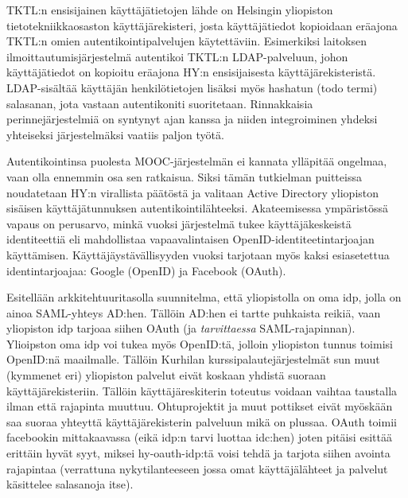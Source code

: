 \documentclass[finnish,gradu]{tktltiki}
\begin{document}
  TKTL:n ensisijainen käyttäjätietojen lähde on Helsingin yliopiston tietotekniikkaosaston käyttäjärekisteri, josta käyttäjätiedot kopioidaan eräajona TKTL:n omien autentikointipalvelujen käytettäviin. Esimerkiksi laitoksen ilmoittautumisjärjestelmä autentikoi TKTL:n LDAP-palveluun, johon käyttäjätiedot on kopioitu eräajona HY:n ensisijaisesta käyttäjärekisteristä. LDAP-sisältää käyttäjän henkilötietojen lisäksi myös hashatun (todo termi) salasanan, jota vastaan autentikoniti suoritetaan. Rinnakkaisia perinnejärjestelmiä on syntynyt ajan kanssa ja niiden integroiminen yhdeksi yhteiseksi järjestelmäksi vaatiis paljon työtä.

  Autentikointinsa puolesta MOOC-järjestelmän ei kannata ylläpitää ongelmaa, vaan olla ennemmin osa sen ratkaisua. Siksi tämän tutkielman puitteissa noudatetaan HY:n virallista päätöstä ja valitaan Active Directory yliopiston sisäisen käyttäjätunnuksen autentikointilähteeksi. Akateemisessa ympäristössä vapaus on perusarvo, minkä vuoksi järjestelmä tukee käyttäjäkeskeistä identiteettiä eli mahdollistaa vapaavalintaisen OpenID-identiteetintarjoajan käyttämisen. Käyttäjäystävällisyyden vuoksi tarjotaan myös kaksi esiasetettua identintarjoajaa: Google (OpenID) ja Facebook (OAuth).

  Esitellään arkkitehtuuritasolla suunnitelma, että yliopistolla on oma idp, jolla on ainoa SAML-yhteys AD:hen. Tällöin AD:hen ei tartte puhkaista reikiä, vaan yliopiston idp tarjoaa siihen OAuth (ja \emph{tarvittaessa} SAML-rajapinnan). Ylioipston oma idp voi tukea myös OpenID:tä, jolloin yliopiston tunnus toimisi OpenID:nä maailmalle. Tällöin Kurhilan kurssipalautejärjestelmät sun muut (kymmenet eri) yliopiston palvelut eivät koskaan yhdistä suoraan käyttäjärekisteriin. Tällöin käyttäjäreskiterin toteutus voidaan vaihtaa taustalla ilman että rajapinta muuttuu. Ohtuprojektit ja muut pottikset eivät myöskään saa suoraa yhteyttä käyttäjärekisterin palveluun mikä on plussaa. OAuth toimii facebookin mittakaavassa (eikä idp:n tarvi luottaa idc:hen) joten pitäisi esittää erittäin hyvät syyt, miksei hy-oauth-idp:tä voisi tehdä ja tarjota siihen avointa rajapintaa (verrattuna nykytilanteeseen jossa omat käyttäjälähteet ja palvelut käsittelee salasanoja itse).

\end{document}
